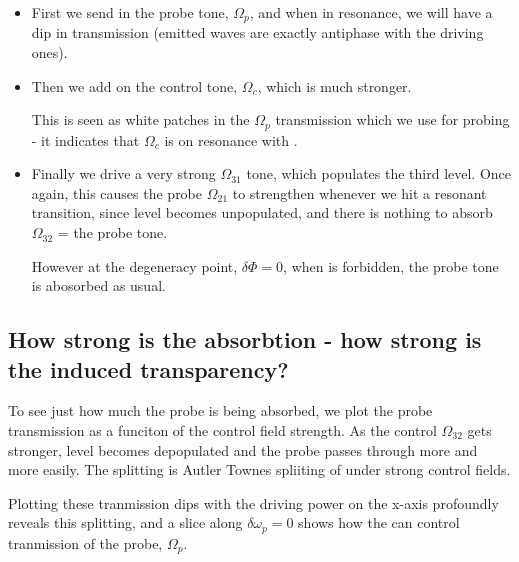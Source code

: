   \begin{itemize}
  	\item First we send in the probe tone, $ \Omega_p $, and when in resonance, we will have a dip in transmission (emitted waves are exactly antiphase with the driving ones).
  
  
   \item Then we add on the control tone, $ \Omega_{c} $, which is much stronger.
   
   \textbf{}
   
   This is seen as white patches in the $ \Omega_p $ transmission which we use for probing - it indicates that $ \Omega_c $ is on resonance with \lra{}.
   
   
   \item Finally we drive a very strong $ \Omega_{31} $ tone, which populates the third level. Once again, this causes the probe $ \Omega_{21} $ to strengthen whenever we hit a resonant \lra{} transition, since level  becomes unpopulated, and there is nothing to absorb $ \Omega_{32} $ = the probe tone.
   
  However at the degeneracy point, $ \delta\Phi = 0 $, when \lra{} is forbidden, the probe tone is abosorbed as usual.
  
   
  \end{itemize}
  
\subsection{How strong is the absorbtion - how strong is the induced transparency?}
  To see just how much the probe is being absorbed, we plot the probe transmission as a funciton of the control field strength. As the control $ \Omega_{32} $ gets stronger, level  becomes depopulated and the probe passes through more and more easily. The splitting is Autler Townes spliiting of  under strong control fields.
  
 
 Plotting these tranmission dips with the driving power on the x-axis profoundly reveals this splitting, and a slice along $ \delta\omega_p = 0 $ shows how the  can control tranmission of the probe, $ \Omega_p $.
 
 
 
 \newpage
 
 